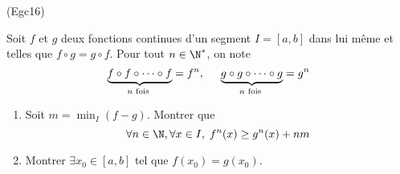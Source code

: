 \begin{tiny}(Egc16)\end{tiny} Soit $f$ et $g$ deux fonctions continues d'un segment $I=[a,b]$ dans lui même et telles que $f\circ g = g \circ f$.\newline
Pour tout $n\in \N^*$, on note
\begin{displaymath}
  \underset{ n \text{ fois }}{\underbrace{f\circ f \circ \cdots \circ f}} = f^n, \hspace{0.5cm}
\underset{ n \text{ fois }}{\underbrace{g\circ g \circ \cdots \circ g}} = g^n
\end{displaymath}
\begin{enumerate}
  \item Soit $m = \min_{I}(f-g)$. Montrer que
\begin{displaymath}
\forall n \in \N, \forall x\in I, \; f^n(x) \geq g^n(x) + nm
\end{displaymath}
\item Montrer $\exists x_0\in [a,b]$ tel que $f(x_0)=g(x_0)$.
\end{enumerate}
